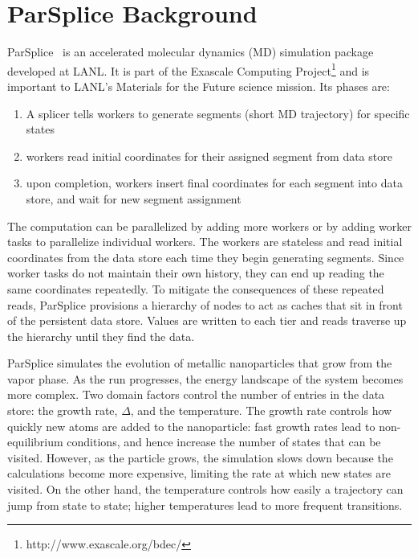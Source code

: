 \section{ParSplice Background}
\label{sec:parsplice}

ParSplice~\cite{perez:jctc20150parsplice} is an accelerated molecular dynamics
(MD) simulation package developed at LANL. It is part of the Exascale Computing
Project\footnote{http://www.exascale.org/bdec/} and is important to LANL's
Materials for the Future science mission. Its phases are:

\begin{enumerate}

  \item A splicer tells workers to generate segments (short MD trajectory) for
  specific states

  \item workers read initial coordinates for their assigned segment from data store

  \item upon completion, workers insert final coordinates for each segment into
  data store, and wait for new segment assignment

\end{enumerate}

The computation can be parallelized by adding more workers or by adding worker
tasks to parallelize individual workers.  The workers are stateless and read
initial coordinates from the data store each time they begin generating
segments. Since worker tasks do not maintain their own history, they can end up
reading the same coordinates repeatedly. To mitigate the consequences of these
repeated reads, ParSplice provisions a hierarchy of nodes to act as caches that
sit in front of the persistent data store.  Values are written to each tier and
reads traverse up the hierarchy until they find the data. 

ParSplice simulates the evolution of metallic nanoparticles that grow
from the vapor phase. As the run progresses, the energy landscape of the system
becomes more complex. Two domain factors control the number of entries in the
data store: the growth rate, \(\Delta\), and the temperature. The growth rate controls how
quickly new atoms are added to the nanoparticle: fast growth rates lead to
non-equilibrium conditions, and hence increase the number of states that can be
visited. However, as the particle grows, the simulation slows down because the
calculations become more expensive, limiting the rate at which new states are
visited. On the other hand, the temperature controls how easily a trajectory
can jump from state to state; higher temperatures lead to more frequent
transitions.

